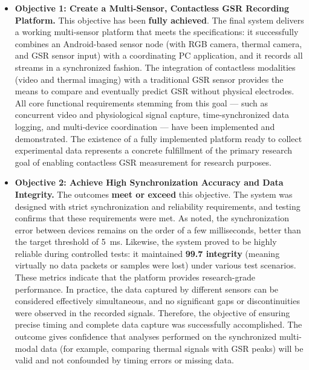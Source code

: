 \documentclass[11pt,a4paper]{report}
\begin{document}
\begin{itemize}
\item \textbf{Objective 1: Create a Multi-Sensor, Contactless GSR Recording
  Platform.} This objective has been \textbf{fully achieved}. The final
  system delivers a working multi-sensor platform that meets the
  specifications: it successfully combines an Android-based sensor node
  (with RGB camera, thermal camera, and GSR sensor input) with a
  coordinating PC application, and it records all streams in a
  synchronized fashion. The integration of contactless modalities (video
  and thermal imaging) with a traditional GSR sensor provides the means
  to compare and eventually predict GSR without physical electrodes. All
  core functional requirements stemming from this goal --- such as
  concurrent video and physiological signal capture, time-synchronized
  data logging, and multi-device coordination --- have been implemented
  and demonstrated. The existence of a fully implemented platform ready
  to collect experimental data represents a concrete fulfillment of the
  primary research goal of enabling contactless GSR measurement for
  research purposes.

\item \textbf{Objective 2: Achieve High Synchronization Accuracy and Data
  Integrity.} The outcomes \textbf{meet or exceed} this objective. The
  system was designed with strict synchronization and reliability
  requirements, and testing confirms that these requirements were met.
  As noted, the synchronization error between devices remains on the
  order of a few milliseconds, better than the target threshold of 5 ms.
  Likewise, the system proved to be highly reliable during controlled
  tests: it maintained \textbf{99.7%
  integrity} (meaning virtually no data packets or samples were lost)
  under various test
  scenarios\cite{AppleHealthWatch2019}.
  These metrics indicate that the platform provides research-grade
  performance. In practice, the data captured by different sensors can
  be considered effectively simultaneous, and no significant gaps or
  discontinuities were observed in the recorded signals. Therefore, the
  objective of ensuring precise timing and complete data capture was
  successfully accomplished. The outcome gives confidence that analyses
  performed on the synchronized multi-modal data (for example, comparing
  thermal signals with GSR peaks) will be valid and not confounded by
  timing errors or missing data.


\end{itemize}
\end{document}

